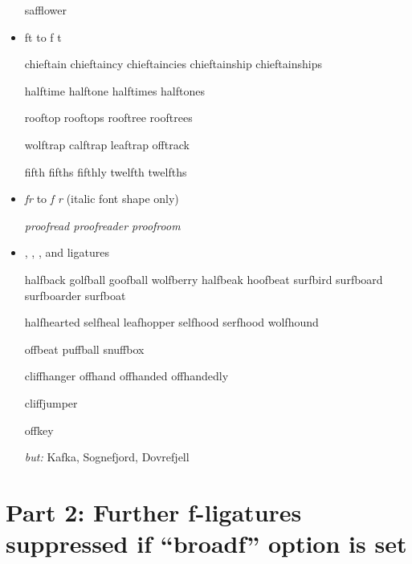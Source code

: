 \begin{itemize}
safflower



\item ft to f\kern0pt t

chieftain chieftaincy chieftaincies chieftainship chieftainships

halftime halftone halftimes halftones

rooftop rooftops rooftree rooftrees

wolftrap calftrap leaftrap offtrack

fifth fifths fifthly twelfth twelfths



\item \emph{fr} to \emph{f\kern0pt r} (italic font shape only)

\emph{proofread proofreader proofroom}


\item \bgroup \ebg {}, , , and  ligatures \egroup

halfback golfball goofball wolfberry halfbeak hoofbeat surfbird surfboard surfboarder surfboat

halfhearted selfheal leafhopper selfhood serfhood wolfhound

offbeat puffball snuffbox

cliffhanger offhand offhanded offhandedly

cliffjumper

offkey

\emph{but:} {\ebg Kafka, Sognefjord, Dovrefjell}




\end{itemize}

\section*{Part 2: Further f-ligatures suppressed if ``broadf'' option is set}

